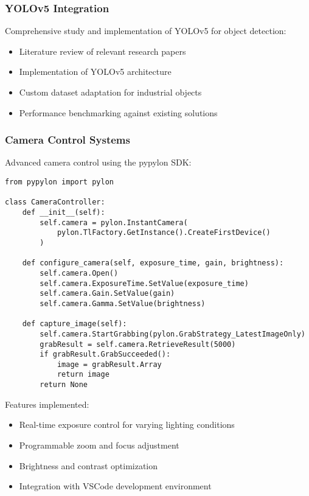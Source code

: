\documentclass[12pt]{article}
\begin{document}
\subsubsection{YOLOv5 Integration}
Comprehensive study and implementation of YOLOv5 for object detection:
\begin{itemize}
\item Literature review of relevant research papers
\item Implementation of YOLOv5 architecture
\item Custom dataset adaptation for industrial objects
\item Performance benchmarking against existing solutions
\end{itemize}

\subsubsection{Camera Control Systems}
Advanced camera control using the pypylon SDK:

\begin{lstlisting}[style=pythonstyle, caption={Camera Control Implementation}]
from pypylon import pylon

class CameraController:
    def __init__(self):
        self.camera = pylon.InstantCamera(
            pylon.TlFactory.GetInstance().CreateFirstDevice()
        )
        
    def configure_camera(self, exposure_time, gain, brightness):
        self.camera.Open()
        self.camera.ExposureTime.SetValue(exposure_time)
        self.camera.Gain.SetValue(gain)
        self.camera.Gamma.SetValue(brightness)
        
    def capture_image(self):
        self.camera.StartGrabbing(pylon.GrabStrategy_LatestImageOnly)
        grabResult = self.camera.RetrieveResult(5000)
        if grabResult.GrabSucceeded():
            image = grabResult.Array
            return image
        return None
\end{lstlisting}

Features implemented:
\begin{itemize}
\item Real-time exposure control for varying lighting conditions
\item Programmable zoom and focus adjustment
\item Brightness and contrast optimization
\item Integration with VSCode development environment
\end{itemize}
\end{document}
